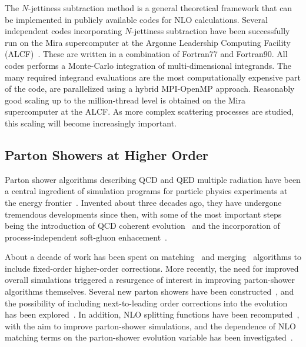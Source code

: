 \documentclass{article}
\begin{document}
The  $N$-jettiness subtraction method is a general theoretical framework that can be implemented in publicly available  codes for NLO calculations.  Several independent codes incorporating $N$-jettiness subtraction have been successfully run on the Mira supercomputer at the Argonne Leadership Computing Facility (ALCF)~\cite{Boughezal:2016wmq,Abelof:2016pby}.  These are written in a combination of Fortran77 and Fortran90.   All codes performs a Monte-Carlo integration of multi-dimensional integrands.  The many required integrand evaluations are the most computationally expensive part of the code, are parallelized using a hybrid MPI-OpenMP approach.  Reasonably good scaling up to the million-thread level is obtained on the Mira supercomputer at the ALCF.  As more complex scattering processes are studied, this scaling will become increasingly important.  

\subsection{Parton Showers at Higher Order}
Parton shower algorithms describing QCD and QED multiple radiation have been
a central ingredient of simulation programs for particle physics experiments
at the energy frontier~\cite{Webber:1986mc,Buckley:2011ms}. Invented about
three decades ago, they have undergone tremendous developments since then, 
with some of the most important steps being the introduction of QCD coherent evolution~\cite{Webber:1983if,Marchesini:1983bm,Marchesini:1987cf} and the 
incorporation of process-independent soft-gluon enhacement~\cite{Catani:1990rr}.

About a decade of work has been spent on matching~\cite{Frixione:2002ik,
  Hoeche:2011fd,Hamilton:2012rf,Hamilton:2013fea,Hoeche:2014aia,Hoche:2014dla}
and merging~\cite{Catani:2001cc,Lonnblad:2001iq,Krauss:2002up,Mangano:2006rw,
  Alwall:2007fs,Hoeche:2009rj,Hamilton:2010wh,Hoeche:2012yf,Platzer:2012bs,
  Lonnblad:2012ix,Lonnblad:2012ng,Frederix:2012ps} algorithms to include 
fixed-order higher-order corrections. More recently, the need for improved 
overall simulations triggered a resurgence of interest in improving 
parton-shower algorithms themselves. Several new parton showers have been 
constructed~\cite{Gieseke:2003rz,Sjostrand:2004ef,Schumann:2007mg,Dinsdale:2007mf,
  Winter:2007ye,Giele:2007di,Platzer:2009jq,Ritzmann:2012ca,Hoche:2015sya}, 
and the possibility of including next-to-leading order corrections into 
the evolution has been explored~\cite{Hartgring:2013jma,Li:2016yez,
  Hoche:2017iem,Hoche:2017hno,Nagy:2017ggp}. In addition, NLO splitting functions 
have been recomputed~\cite{Jadach:2011kc,Gituliar:2014eba}, with the aim 
to improve parton-shower simulations, and the dependence of NLO matching terms on the 
parton-shower evolution variable has been investigated~\cite{Jadach:2016zgk}.
\end{document}
